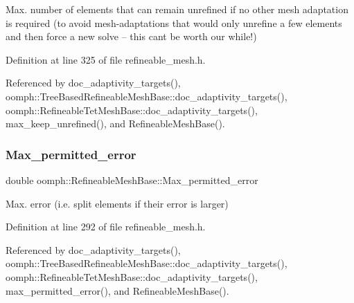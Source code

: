 Max. number of elements that can remain unrefined if no other mesh adaptation is required (to avoid mesh-\/adaptations that would only unrefine a few elements and then force a new solve -- this can\textquotesingle{}t be worth our while!) 



Definition at line 325 of file refineable\+\_\+mesh.\+h.



Referenced by doc\+\_\+adaptivity\+\_\+targets(), oomph\+::\+Tree\+Based\+Refineable\+Mesh\+Base\+::doc\+\_\+adaptivity\+\_\+targets(), oomph\+::\+Refineable\+Tet\+Mesh\+Base\+::doc\+\_\+adaptivity\+\_\+targets(), max\+\_\+keep\+\_\+unrefined(), and Refineable\+Mesh\+Base().

\mbox{\label{classoomph_1_1RefineableMeshBase_af3a2b9ae35dd65e377032c53c4f25ca9}} 
\subsubsection{\texorpdfstring{Max\+\_\+permitted\+\_\+error}{Max\_permitted\_error}}
{\footnotesize\ttfamily double oomph\+::\+Refineable\+Mesh\+Base\+::\+Max\+\_\+permitted\+\_\+error\hspace{0.3cm}{\ttfamily [protected]}}



Max. error (i.\+e. split elements if their error is larger) 



Definition at line 292 of file refineable\+\_\+mesh.\+h.



Referenced by doc\+\_\+adaptivity\+\_\+targets(), oomph\+::\+Tree\+Based\+Refineable\+Mesh\+Base\+::doc\+\_\+adaptivity\+\_\+targets(), oomph\+::\+Refineable\+Tet\+Mesh\+Base\+::doc\+\_\+adaptivity\+\_\+targets(), max\+\_\+permitted\+\_\+error(), and Refineable\+Mesh\+Base().

\mbox{\label{classoomph_1_1RefineableMeshBase_aab8dedbf9f239f89f949f7d968195c0c}} 
